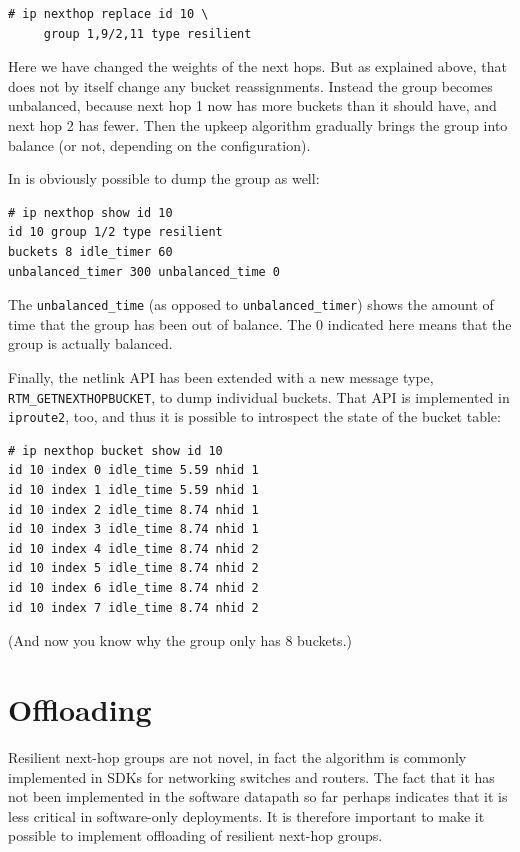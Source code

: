 \documentclass[letterpaper]{article}
\begin{document}
\begin{verbatim}
# ip nexthop replace id 10 \
     group 1,9/2,11 type resilient
\end{verbatim}

Here we have changed the weights of the next hops. But as explained above,
that does not by itself change any bucket reassignments. Instead the group
becomes unbalanced, because next hop 1 now has more buckets than it should
have, and next hop 2 has fewer. Then the upkeep algorithm gradually brings
the group into balance (or not, depending on the configuration).

In is obviously possible to dump the group as well:

\begin{verbatim}
# ip nexthop show id 10
id 10 group 1/2 type resilient
buckets 8 idle_timer 60
unbalanced_timer 300 unbalanced_time 0
\end{verbatim}

The \texttt{unbalanced\_time} (as opposed to \texttt{unbalanced\_timer})
shows the amount of time that the group has been out of balance. The 0
indicated here means that the group is actually balanced.

Finally, the netlink API has been extended with a new message type,
\texttt{RTM\_GETNEXTHOPBUCKET}, to dump individual buckets. That API is
implemented in \texttt{iproute2}, too, and thus it is possible to
introspect the state of the bucket table:

\begin{verbatim}
# ip nexthop bucket show id 10
id 10 index 0 idle_time 5.59 nhid 1
id 10 index 1 idle_time 5.59 nhid 1
id 10 index 2 idle_time 8.74 nhid 1
id 10 index 3 idle_time 8.74 nhid 1
id 10 index 4 idle_time 8.74 nhid 2
id 10 index 5 idle_time 8.74 nhid 2
id 10 index 6 idle_time 8.74 nhid 2
id 10 index 7 idle_time 8.74 nhid 2
\end{verbatim}

(And now you know why the group only has 8 buckets.)

\section{Offloading}

Resilient next-hop groups are not novel, in fact the algorithm is commonly
implemented in SDKs for networking switches and routers. The fact that it
has not been implemented in the software datapath so far perhaps indicates
that it is less critical in software-only deployments. It is therefore
important to make it possible to implement offloading of resilient next-hop
groups.
\end{document}
